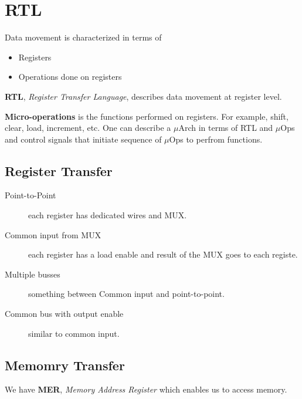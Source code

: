 \section{RTL}
Data movement is characterized in terms of
\begin{itemize}
    \item Registers
    \item Operations done on registers
\end{itemize}
\textbf{RTL}, \textit{Register Transfer Language}, describes data movement at register level.

\textbf{Micro-operations} is the functions performed on registers. For example, shift, clear, load, increment, etc.
One can describe a \(\mu\)Arch in terms of RTL and \(\mu\)Ops and control signals that initiate sequence of \(\mu\)Ops to perfrom functions.
\subsection{Register Transfer}
\begin{description}
    \item [Point-to-Point] each register has dedicated wires and MUX.
    \item [Common input from MUX] each register has a load enable and result of the MUX goes to each registe.
    \item [Multiple busses] something between Common input and point-to-point.
    \item [Common bus with output enable] similar to common input.
\end{description}

\subsection{Memomry Transfer}
We have \textbf{MER}, \textit{Memory Address Register} which enables us to access memory.
